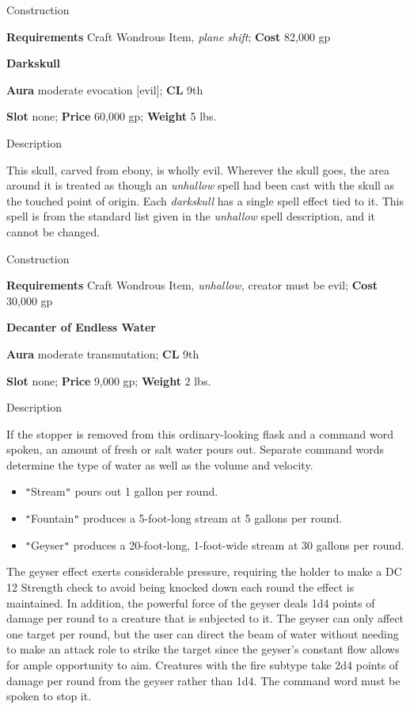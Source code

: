 Construction
				
\textbf{Requirements} Craft Wondrous Item, \textit{plane shift}; \textbf{Cost }82,000 gp
				
\textbf{Darkskull}
				
\textbf{Aura} moderate evocation \mbox{$[$}evil\mbox{$]$};\textbf{ CL }9th
				
\textbf{Slot} none; \textbf{Price} 60,000 gp; \textbf{Weight} 5 lbs.
				
Description
				
This skull, carved from ebony, is wholly evil. Wherever the skull goes, the area around it is treated as though an \textit{unhallow }spell had been cast with the skull as the touched point of origin. Each \textit{darkskull }has a single spell effect tied to it. This spell is from the standard list given in the \textit{unhallow }spell description, and it cannot be changed. 
				
Construction
				
\textbf{Requirements} Craft Wondrous Item, \textit{unhallow,} creator must be evil; \textbf{Cost }30,000 gp
				
\textbf{Decanter of Endless Water}
				
\textbf{Aura} moderate transmutation;\textbf{ CL }9th
				
\textbf{Slot} none; \textbf{Price} 9,000 gp; \textbf{Weight} 2 lbs.
				
Description
				
If the stopper is removed from this ordinary-looking flask and a command word spoken, an amount of fresh or salt water pours out. Separate command words determine the type of water as well as the volume and velocity.
\begin{itemize}\item  \texttt{{}"{}}Stream\texttt{{}"{}} pours out 1 gallon per round.
\item  \texttt{{}"{}}Fountain\texttt{{}"{}} produces a 5-foot-long stream at 5 gallons per round.
\item  \texttt{{}"{}}Geyser\texttt{{}"{}} produces a 20-foot-long, 1-foot-wide stream at 30 gallons per round.
\end{itemize}
				
The geyser effect exerts considerable pressure, requiring the holder to make a DC 12 Strength check to avoid being knocked down each round the effect is maintained. In addition, the powerful force of the geyser deals 1d4 points of damage per round to a creature that is subjected to it. The geyser can only affect one target per round, but the user can direct the beam of water without needing to make an attack role to strike the target since the geyser's constant flow allows for ample opportunity to aim. Creatures with the fire subtype take 2d4 points of damage per round from the geyser rather than 1d4. The command word must be spoken to stop it. 
				
